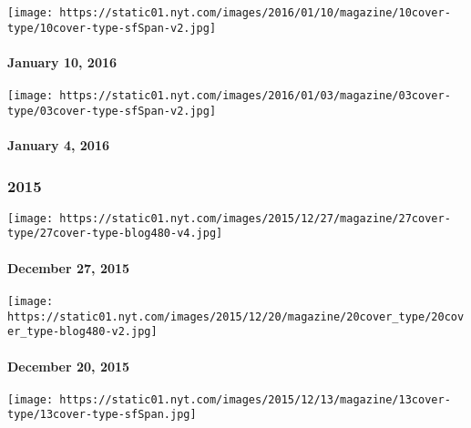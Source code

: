 \href{http://www.nytimes.com/indexes/2016/01/10/magazine/index.html}{}

\texttt{[image: https://static01.nyt.com/images/2016/01/10/magazine/10cover-type/10cover-type-sfSpan-v2.jpg]}

\hypertarget{january-10-2016}{%
\paragraph{January 10, 2016}\label{january-10-2016}}

\href{http://www.nytimes.com/indexes/2016/01/04/magazine/index.html}{}

\texttt{[image: https://static01.nyt.com/images/2016/01/03/magazine/03cover-type/03cover-type-sfSpan-v2.jpg]}

\hypertarget{january-4-2016}{%
\paragraph{January 4, 2016}\label{january-4-2016}}

\hypertarget{2015}{%
\subsubsection{2015}\label{2015}}

\href{http://www.nytimes.com/indexes/2015/12/27/magazine/index.html}{}

\texttt{[image: https://static01.nyt.com/images/2015/12/27/magazine/27cover-type/27cover-type-blog480-v4.jpg]}

\hypertarget{december-27-2015}{%
\paragraph{December 27, 2015}\label{december-27-2015}}

\href{http://www.nytimes.com/indexes/2015/12/20/magazine/index.html}{}

\texttt{[image: https://static01.nyt.com/images/2015/12/20/magazine/20cover\_type/20cover\_type-blog480-v2.jpg]}

\hypertarget{december-20-2015}{%
\paragraph{December 20, 2015}\label{december-20-2015}}

\href{http://www.nytimes.com/indexes/2015/12/13/magazine/index.html}{}

\texttt{[image: https://static01.nyt.com/images/2015/12/13/magazine/13cover-type/13cover-type-sfSpan.jpg]}

